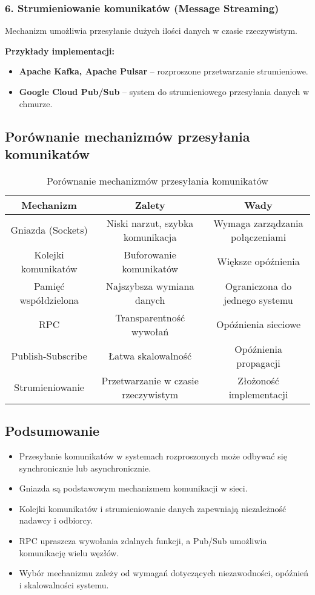 \subsubsection{6. Strumieniowanie komunikatów (Message Streaming)}
Mechanizm umożliwia przesyłanie dużych ilości danych w czasie rzeczywistym.

\textbf{Przykłady implementacji:}
\begin{itemize}
    \item \textbf{Apache Kafka, Apache Pulsar} – rozproszone przetwarzanie strumieniowe.
    \item \textbf{Google Cloud Pub/Sub} – system do strumieniowego przesyłania danych w chmurze.
\end{itemize}

\subsection{Porównanie mechanizmów przesyłania komunikatów}

\begin{table}[h]
    \centering
    \renewcommand{\arraystretch}{1.3}
    \begin{tabular}{|c|c|c|}
        \hline
        \textbf{Mechanizm} & \textbf{Zalety} & \textbf{Wady} \\
        \hline
        Gniazda (Sockets) & Niski narzut, szybka komunikacja & Wymaga zarządzania połączeniami \\
        \hline
        Kolejki komunikatów & Buforowanie komunikatów & Większe opóźnienia \\
        \hline
        Pamięć współdzielona & Najszybsza wymiana danych & Ograniczona do jednego systemu \\
        \hline
        RPC & Transparentność wywołań & Opóźnienia sieciowe \\
        \hline
        Publish-Subscribe & Łatwa skalowalność & Opóźnienia propagacji \\
        \hline
        Strumieniowanie & Przetwarzanie w czasie rzeczywistym & Złożoność implementacji \\
        \hline
    \end{tabular}
    \caption{Porównanie mechanizmów przesyłania komunikatów}
\end{table}

\subsection{Podsumowanie}
\begin{itemize}
    \item Przesyłanie komunikatów w systemach rozproszonych może odbywać się synchronicznie lub asynchronicznie.
    \item Gniazda są podstawowym mechanizmem komunikacji w sieci.
    \item Kolejki komunikatów i strumieniowanie danych zapewniają niezależność nadawcy i odbiorcy.
    \item RPC upraszcza wywołania zdalnych funkcji, a Pub/Sub umożliwia komunikację wielu węzłów.
    \item Wybór mechanizmu zależy od wymagań dotyczących niezawodności, opóźnień i skalowalności systemu.
\end{itemize}
